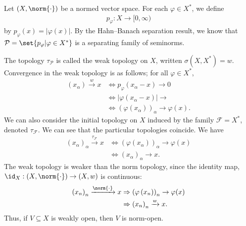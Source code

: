 \documentclass[10pt]{mypackage}
\begin{document}
\begin{example}
  Let $\left(X,\norm{\cdot}\right)$ be a normed vector space. For each $\varphi\in X^{\ast}$, we define
  \begin{align*}
    p_{\varphi}: X\rightarrow [0,\infty)
  \end{align*}
  by $p_{\varphi}\left(x\right) = \left\vert \varphi(x) \right\vert$. By the Hahn--Banach separation result, we know that $\mathcal{P} = \set{p_{\varphi}| \varphi\in X^{\ast}}$ is a separating family of seminorms.\newline

  The topology $\tau_{\mathcal{P}}$ is called the weak topology on $X$, written $\sigma\left(X,X^{\ast}\right) = w$. Convergence in the weak topology is as follows; for all $\varphi\in X^{\ast}$,
  \begin{align*}
    \left(x_{\alpha}\right)\xrightarrow{w}x &\Leftrightarrow p_{\varphi}\left(x_{\alpha}-x\right)\rightarrow 0\\
                                            &\Leftrightarrow \left\vert \varphi\left(x_{\alpha}-x\right) \right\vert\rightarrow\\
                                            &\Leftrightarrow \left(\varphi\left(x_{\alpha}\right)\right)_{\alpha}\rightarrow \varphi(x).
  \end{align*}
  We can also consider the initial topology on $X$ induced by the family $\mathcal{F} = X^{\ast}$, denoted $\tau_{\mathcal{F}}$. We can see that the particular topologies coincide. We have
  \begin{align*}
    \left(x_{\alpha}\right)_{\alpha}\xrightarrow{\tau_{\mathcal{F}}}x &\Leftrightarrow \left(\varphi\left(x_{\alpha}\right)\right)_{\alpha}\rightarrow \varphi\left(x\right)\\
                                                                      &\Leftrightarrow \left(x_{\alpha}\right)_{\alpha}\rightarrow x.
  \end{align*}
  The weak topology is weaker than the norm topology, since the identity map, $\id_{X}: \left(X,\norm{\cdot}\right)\rightarrow \left(X,w\right)$ is continuous:
  \begin{align*}
    \left(x_{n}\right)_n\xrightarrow{\norm{\cdot}} x &\Rightarrow \left(\varphi\left(x_n\right)\right)_{n}\rightarrow \varphi(x)\\
                                                     &\Rightarrow \left(x_n\right)_{n}\xrightarrow{w} x.
  \end{align*}
  Thus, if $V\subseteq X$ is weakly open, then $V$ is norm-open.
\end{example}
\end{document}
